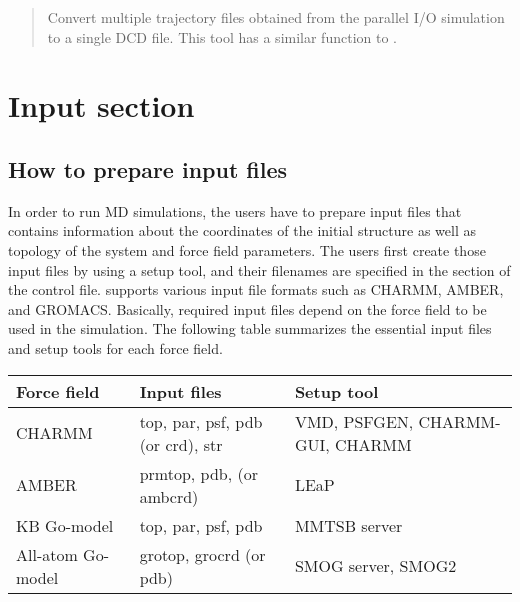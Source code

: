 \documentclass[a4paper,11pt,oneside,english]{sphinxmanual}
\begin{document}
\begin{quote}

Convert multiple trajectory files obtained from the parallel I/O simulation to a single DCD file.
This tool has a similar function to .
\end{quote}


\chapter{Input section}
\label{\detokenize{03_Input:input-section}}\label{\detokenize{03_Input:input}}\label{\detokenize{03_Input::doc}}

\section{How to prepare input files}
\label{\detokenize{03_Input:how-to-prepare-input-files}}
In order to run MD simulations, the users have to prepare input files that contains
information about the coordinates of the initial structure as well as
topology of the system and force field parameters.
The users first create those input files by using a setup tool,
and their filenames are specified in the \sphinxstylestrong{{[}INPUT{]}} section of the control file.
 supports various input file formats such as CHARMM, AMBER, and GROMACS.
Basically, required input files depend on the force field to be used in the simulation.
The following table summarizes the essential input files and setup tools for each force field.


\begin{savenotes}\sphinxattablestart
\centering
\begin{tabulary}{\linewidth}[t]{|T|T|T|}
\hline
\sphinxstyletheadfamily 
Force field
&\sphinxstyletheadfamily 
Input files
&\sphinxstyletheadfamily 
Setup tool
\\
\hline
CHARMM
&
top, par, psf, pdb (or crd), str
&
VMD, PSFGEN, CHARMM-GUI, CHARMM
\\
\hline
AMBER
&
prmtop, pdb, (or ambcrd)
&
LEaP
\\
\hline
KB Go-model
&
top, par, psf, pdb
&
MMTSB server
\\
\hline
All-atom Go-model
&
grotop, grocrd (or pdb)
&
SMOG server, SMOG2
\\
\hline
\end{tabulary}
\par
\sphinxattableend\end{savenotes}
\end{document}
